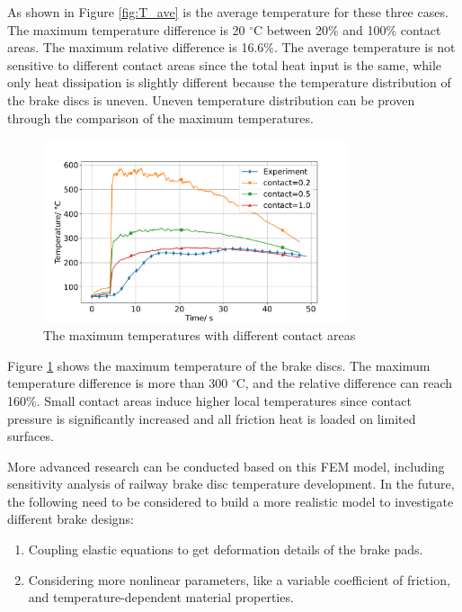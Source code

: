 As shown in Figure \ref{fig:T_ave} is the average temperature for these three cases. The maximum temperature difference is 20 $^{\circ}\text{C}$ between 20\% and 100\% contact areas. The maximum relative difference is 16.6\%. The average temperature is not sensitive to different contact areas since the total heat input is the same, while only heat dissipation is slightly different because the temperature distribution of the brake discs is uneven. Uneven temperature distribution can be proven through the comparison of the maximum temperatures.

\begin{figure}[h]
    \centering
    \includegraphics[width=0.8\textwidth]{book/chapters/zhang/graphics/T_max_dc.pdf}
    \caption{The maximum temperatures with different contact areas}
    \label{fig:T_max}
\end{figure}

Figure \ref{fig:T_max} shows the maximum temperature of the brake discs. The maximum temperature difference is more than 300 $^{\circ}\text{C}$, and the relative difference can reach 160\%. Small contact areas induce higher local temperatures since contact pressure is significantly increased and all friction heat is loaded on limited surfaces.

More advanced research can be conducted based on this FEM model, including sensitivity analysis of railway brake disc temperature development. In the future, the following need to be considered to build a more realistic model to investigate different brake designs:

\begin{enumerate}
\item Coupling elastic equations to get deformation details of the brake pads.
\item Considering more nonlinear parameters, like a variable coefficient of friction, and temperature-dependent material properties.
\end{enumerate}


